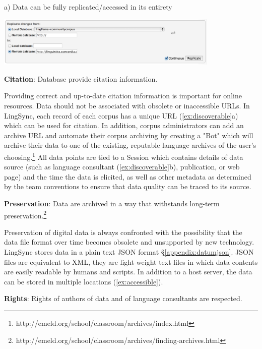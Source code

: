 \documentclass[letterpaper, 12pt, dvips]{mitwpl}
\begin{document}
\begin{description}
\begin{exe} 
\ex a) Data can be fully replicated/accessed in its entirety

 \centering
   \includegraphics[width=0.8\textwidth]{accessible}

\label{ex:accessible}
\end{exe}

\item {\bf Citation}: Database provide citation information. 
 
Providing correct and up-to-date citation information is important for online resources. Data should not be associated with obsolete or inaccessible URLs.  
In LingSync, each record of each corpus has a unique URL (\ref{ex:discoverable}a) which can be used for citation. In addition, corpus administrators can add an archive URL and automate their corpus archiving by creating a "Bot" which will archive their data to one of the existing, reputable language archives of the user's choosing.\footnote{http://emeld.org/school/classroom/archives/index.html} All data points are tied to a Session which contains details of data source (such as language consultant (\ref{ex:discoverable}b), publication, or web page) and the time the data is elicited, as well as other metadata as determined by the team conventions to ensure that data quality can be traced to its source. 

\item {\bf Preservation}: Data are archived in a way that withstands long-term preservation.\footnote{http://emeld.org/school/classroom/archives/finding-archives.html}

Preservation of digital data is always confronted with the possibility that the data file format over time becomes obsolete and unsupported by new technology. LingSync stores data in a plain text JSON format \S \ref{appendix:datumjson}. JSON files  are equivalent to XML, they are light-weight text files in which data contents are easily readable by humans and scripts. In addition to a host server, the data can be stored in multiple locations  (\ref{ex:accessible}). 


\item {\bf Rights}: Rights of authors of data and of language consultants are respected. 


\end{description}
\end{document}
